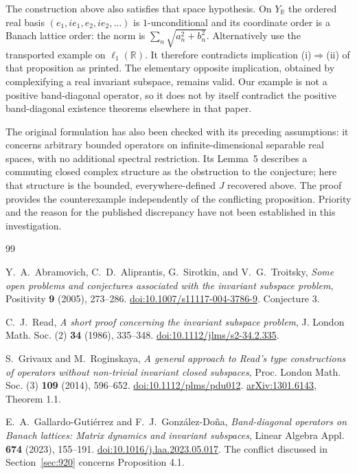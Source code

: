 \documentclass[11pt,a4paper]{article}
\theoremstyle{remark}
\begin{document}
The construction above also satisfies that space hypothesis.
On $Y_{\mathbb R}$ the ordered real basis
$(e_1,ie_1,e_2,ie_2,\ldots)$ is $1$-unconditional and its coordinate
order is a Banach lattice order: the norm is
$\sum_n\sqrt{a_n^2+b_n^2}$.  Alternatively use the transported example
on $\ell_1(\mathbb R)$.  It therefore contradicts implication
\textup{(i)$\Rightarrow$(ii)} of that proposition as printed.
The elementary opposite implication, obtained by complexifying a real
invariant subspace, remains valid.  Our example is not a positive
band-diagonal operator, so it does not by itself contradict the positive
band-diagonal existence theorems elsewhere in that paper.

The original formulation \cite[Conjecture~3]{AAST2005} has also been
checked with its preceding assumptions: it concerns arbitrary bounded
operators on infinite-dimensional separable real spaces, with no
additional spectral restriction.  Its Lemma~5 describes a commuting
closed complex structure as the obstruction to the conjecture; here
that structure is the bounded, everywhere-defined $J$ recovered above.
The proof provides the counterexample independently of the conflicting
proposition.  Priority and the reason for the published discrepancy
have not been established in this investigation.


\begin{thebibliography}{99}
\small
\setlength{\itemsep}{3pt}

Y.~A.~Abramovich, C.~D.~Aliprantis, G.~Sirotkin, and V.~G.~Troitsky,
\emph{Some open problems and conjectures associated with the invariant
subspace problem}, Positivity \textbf{9} (2005), 273--286.
\href{https://doi.org/10.1007/s11117-004-3786-9}{doi:10.1007/s11117-004-3786-9}.
Conjecture 3.

C.~J.~Read,
\emph{A short proof concerning the invariant subspace problem},
J. London Math. Soc. (2) \textbf{34} (1986), 335--348.
\href{https://doi.org/10.1112/jlms/s2-34.2.335}{doi:10.1112/jlms/s2-34.2.335}.

S.~Grivaux and M.~Roginskaya,
\emph{A general approach to Read's type constructions of operators
without non-trivial invariant closed subspaces},
Proc. London Math. Soc. (3) \textbf{109} (2014), 596--652.
\href{https://doi.org/10.1112/plms/pdu012}{doi:10.1112/plms/pdu012}.
\href{https://arxiv.org/abs/1301.6143}{arXiv:1301.6143}, Theorem 1.1.

E.~A.~Gallardo-Guti\'errez and F.~J.~Gonz\'alez-Do\~na,
\emph{Band-diagonal operators on Banach lattices: Matrix dynamics and
invariant subspaces}, Linear Algebra Appl. \textbf{674} (2023), 155--191.
\href{https://doi.org/10.1016/j.laa.2023.05.017}{doi:10.1016/j.laa.2023.05.017}.
The conflict discussed in Section~\ref{sec:920} concerns Proposition 4.1.
\end{thebibliography}
\end{document}
